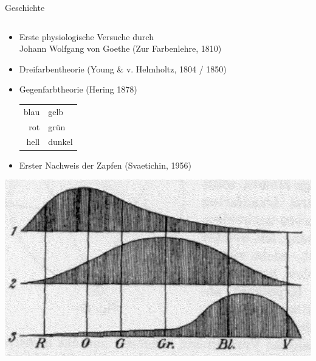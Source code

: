 \documentclass[aspectratio=1610, 9pt]{beamer}
\begin{document}
\begin{frame}[c]{Geschichte}
  \begin{columns}[c, onlytextwidth]
    \hfill
    \begin{column}{0.59\textwidth}
      \begin{itemize}
        \item Erste physiologische Versuche durch\\ Johann Wolfgang von Goethe (Zur Farbenlehre, 1810) \\
        \item Dreifarbentheorie (Young \& v. Helmholtz, 1804 / 1850)
        \item Gegenfarbtheorie (Hering 1878) \\
          \begin{tabular}{r @{${}⟷  {}$} l}
            blau & gelb \\
            rot & grün \\
            hell & dunkel \\
          \end{tabular}
        \item Erster Nachweis der Zapfen (Svaetichin, 1956) 
      \end{itemize}
      \begin{center}
        \includegraphics[width=0.7\linewidth]{images/YoungHelm.jpg}


\end{center}
\end{column}
\end{columns}
\end{frame}
\end{document}
